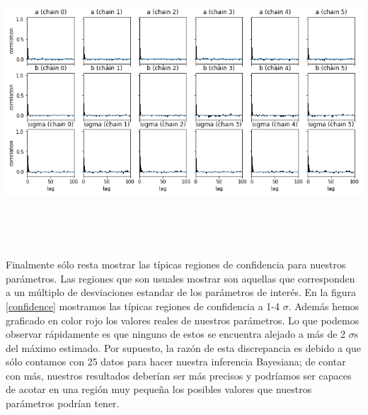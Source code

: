 \documentclass[onecolumn,           %
               showpacs,            %
               preprintnumbers,     %
               aps,                 %
               prl,          	    %
               letterpaper,             %
               superscriptaddress,      %
               nofootinbib,         %
               tightenlines,        %
               floats,floatfix      %
               ,usenatbib,
               ]{revtex4-1}
\begin{document}
\begin{minipage}{\textwidth}
\centering
\includegraphics[height=8cm]{autocorrplots.png}
\label{autocorrplots}
\end{minipage}
\\ $ $

Finalmente s\'olo resta mostrar las t\'ipicas regiones de confidencia para nuestros par\'ametros. Las regiones que son usuales mostrar son aquellas que corresponden a un m\'ultiplo de desviaciones estandar de los par\'ametros de inter\'es. En la figura \ref{confidence} mostramos las t\'ipicas regiones de confidencia a 1-4 $\sigma$. Adem\'as hemos graficado en color rojo los valores reales de nuestros par\'ametros. Lo que podemos observar r\'apidamente es que ninguno de estos se encuentra alejado a m\'as de 2 $\sigma$s del m\'aximo estimado. Por supuesto, la raz\'on de esta discrepancia es debido a que s\'olo contamos con 25 datos para hacer nuestra inferencia Bayesiana; de contar con m\'as, nuestros resultados deber\'ian ser m\'as precisos y podr\'iamos ser capaces de acotar en una regi\'on muy peque\~na los posibles valores que nuestros par\'ametros podr\'ian tener.  
\end{document}
